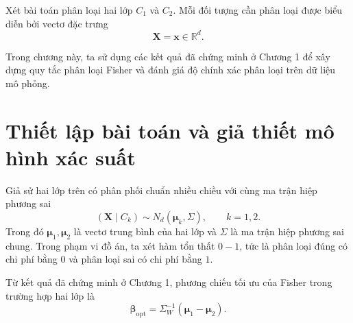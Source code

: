 

Xét bài toán phân loại hai lớp $C_1$ và $C_2$. Mỗi đối tượng cần phân loại được biểu diễn bởi vectơ đặc trưng
\[
\bm{X}=\bm{x}\in\mathbb{R}^d.
\]

Trong chương này, ta sử dụng các kết quả đã chứng minh ở Chương 1 để xây dựng quy tắc phân loại Fisher và đánh giá độ chính xác phân loại trên dữ liệu mô phỏng.

\section{Thiết lập bài toán và giả thiết mô hình xác suất}

Giả sử hai lớp trên có phân phối chuẩn nhiều chiều với cùng ma trận hiệp phương sai
\[
(\bm{X}\mid C_k) \sim N_d(\bm{\mu}_k,\Sigma),
\qquad k=1,2.
\]
Trong đó $\bm{\mu}_1,\bm{\mu}_2$ là vectơ trung bình của hai lớp và $\Sigma$ là ma trận hiệp phương sai chung. Trong phạm vi đồ án, ta xét hàm tổn thất $0-1$, tức là phân loại đúng có chi phí bằng $0$ và phân loại sai có chi phí bằng $1$.

Từ kết quả đã chứng minh ở Chương 1, phương chiếu tối ưu của Fisher trong trường hợp hai lớp là
\[
\bm{\beta}_{\text{opt}}
=
\Sigma_W^{-1}(\bm{\mu}_1-\bm{\mu}_2).
\]

